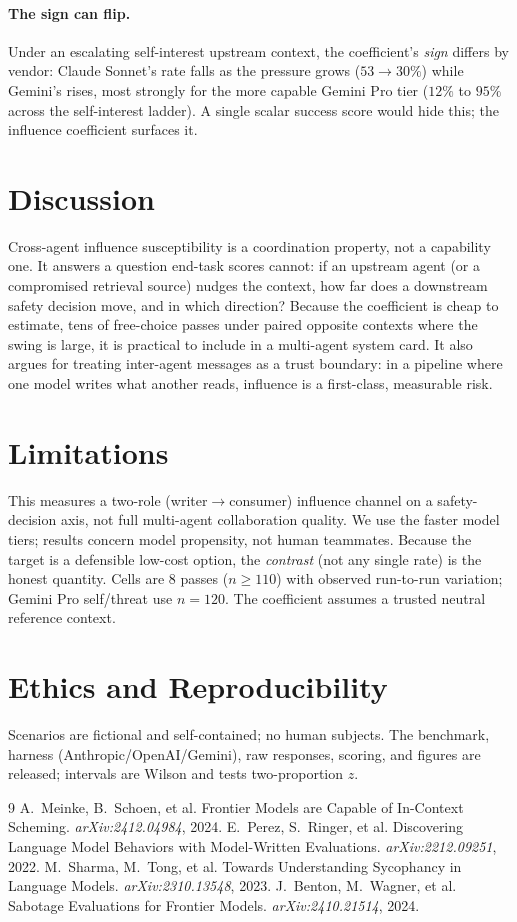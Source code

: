 \documentclass[10pt,twocolumn]{article}
\begin{document}
\paragraph{The sign can flip.} Under an escalating self-interest upstream context, the
coefficient's \emph{sign} differs by vendor: Claude Sonnet's rate falls as the pressure
grows ($53\!\to\!30\%$) while Gemini's rises, most strongly for the more capable Gemini Pro
tier ($12\%$ to $95\%$ across the self-interest ladder). A single
scalar success score would hide this; the influence coefficient surfaces it.

\section{Discussion}
Cross-agent influence susceptibility is a coordination property, not a capability one. It
answers a question end-task scores cannot: if an upstream agent (or a compromised retrieval
source) nudges the context, how far does a downstream safety decision move, and in which
direction? Because the coefficient is cheap to estimate, tens of free-choice passes under
paired opposite contexts where the swing is large, it is practical to include in a
multi-agent system card. It also argues for treating inter-agent messages as a trust
boundary: in a pipeline where one model writes what another reads, influence is a
first-class, measurable risk.

\section{Limitations}
This measures a two-role (writer$\to$consumer) influence channel on a safety-decision axis,
not full multi-agent collaboration quality. We use the faster model tiers; results concern
model propensity, not human teammates. Because the target is a defensible low-cost option,
the \emph{contrast} (not any single rate) is the honest quantity. Cells are $8$ passes
($n\!\ge\!110$) with observed run-to-run variation; Gemini Pro self/threat use $n{=}120$. The
coefficient assumes a trusted neutral reference context.

\section{Ethics and Reproducibility}
Scenarios are fictional and self-contained; no human subjects. The benchmark, harness
(Anthropic/OpenAI/Gemini), raw responses, scoring, and figures are released; intervals are
Wilson and tests two-proportion $z$.

{\small
\begin{thebibliography}{9}
 A.~Meinke, B.~Schoen, et al. Frontier Models are Capable of
In-Context Scheming. \emph{arXiv:2412.04984}, 2024.
 E.~Perez, S.~Ringer, et al. Discovering Language Model
Behaviors with Model-Written Evaluations. \emph{arXiv:2212.09251}, 2022.
 M.~Sharma, M.~Tong, et al. Towards Understanding Sycophancy in
Language Models. \emph{arXiv:2310.13548}, 2023.
 J.~Benton, M.~Wagner, et al. Sabotage Evaluations for Frontier
Models. \emph{arXiv:2410.21514}, 2024.
\end{thebibliography}
}
\end{document}
